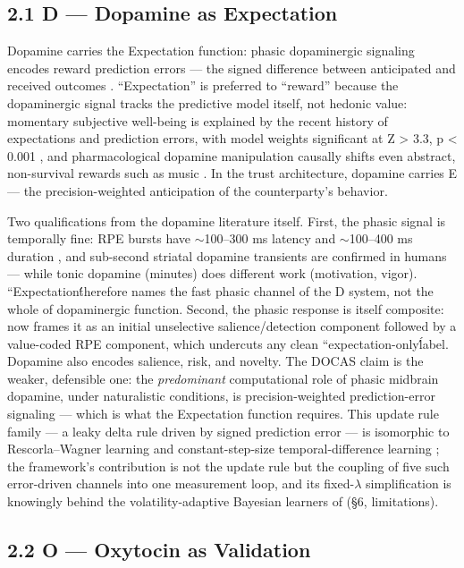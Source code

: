\documentclass[
]{article}
\begin{document}
\subsection{2.1 D --- Dopamine as
Expectation}\label{d-dopamine-as-expectation}

Dopamine carries the Expectation function: phasic dopaminergic signaling
encodes reward prediction errors --- the signed difference between
anticipated and received outcomes . ``Expectation'' is preferred to
``reward'' because the dopaminergic signal tracks the predictive model
itself, not hedonic value: momentary subjective well-being is explained
by the recent history of expectations and prediction errors, with model
weights significant at Z \textgreater{} 3.3, p \textless{} 0.001 , and
pharmacological dopamine manipulation causally shifts even abstract,
non-survival rewards such as music . In the trust architecture, dopamine
carries E --- the precision-weighted anticipation of the counterparty's
behavior.

Two qualifications from the dopamine literature itself. First, the
phasic signal is temporally fine: RPE bursts have \(\sim\)100--300 ms
latency and \(\sim\)100--400 ms duration , and sub-second striatal
dopamine transients are confirmed in humans --- while tonic dopamine
(minutes) does different work (motivation, vigor).
``Expectationt́́herefore names the fast phasic channel of the D system,
not the whole of dopaminergic function. Second, the phasic response is
itself composite: now frames it as an initial unselective
salience/detection component followed by a value-coded RPE component,
which undercuts any clean ``expectation-onlyĺ́abel. Dopamine also encodes
salience, risk, and novelty. The DOCAS claim is the weaker, defensible
one: the \emph{predominant} computational role of phasic midbrain
dopamine, under naturalistic conditions, is precision-weighted
prediction-error signaling --- which is what the Expectation function
requires. This update rule family --- a leaky delta rule driven by
signed prediction error --- is isomorphic to Rescorla--Wagner learning
and constant-step-size temporal-difference learning ; the framework's
contribution is not the update rule but the coupling of five such
error-driven channels into one measurement loop, and its
fixed-\(\lambda\) simplification is knowingly behind the
volatility-adaptive Bayesian learners of (§6, limitations).

\subsection{2.2 O --- Oxytocin as
Validation}\label{o-oxytocin-as-validation}
\end{document}
